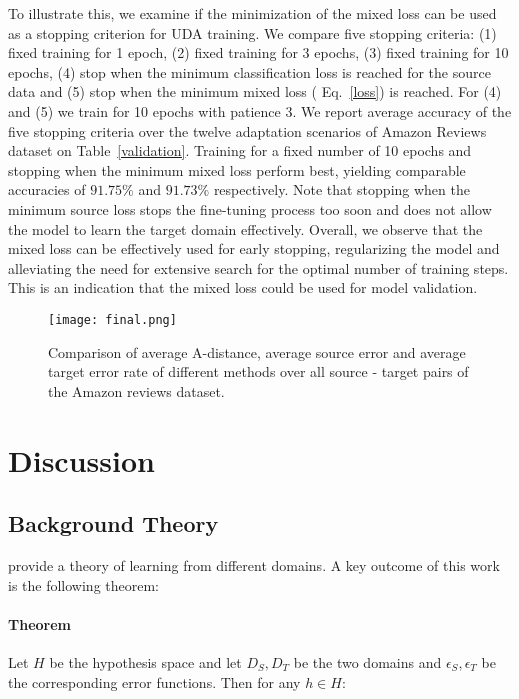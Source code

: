 \documentclass[11pt]{article}
\begin{document}
To illustrate this, we examine if the minimization of the mixed loss can be used as a stopping criterion for UDA training.
We compare five stopping criteria: (1) fixed training for 1 epoch, (2) fixed training for 3 epochs, (3) fixed training for 10 epochs, 
(4) stop when the minimum classification loss is reached for the source data and (5) stop when the minimum mixed loss ( Eq.~\ref{loss}) is reached. For (4) and (5) we train for 10 epochs with patience 3. 
We report average accuracy of the five stopping criteria over the twelve adaptation scenarios of Amazon Reviews dataset on Table~\ref{validation}. 
Training for a fixed number of 10 epochs and stopping when the minimum mixed loss perform best, yielding comparable accuracies of $91.75\%$ and $91.73\%$ respectively.
Note that stopping when the minimum source loss stops the fine-tuning process too soon and does not allow the model to learn the target domain effectively.
Overall, we observe that the mixed loss can be effectively used for early stopping, regularizing the model and alleviating the need for extensive search for the optimal number of training steps.
This is an indication that the mixed loss could be used for model validation.

\begin{figure*}[ht]
\centering
\texttt{[image: final.png]}
\caption{Comparison of average A-distance, average source error and average target error rate of different methods over all source - target pairs of the Amazon reviews dataset. }
\label{fig:adistance}
\end{figure*}

\section{Discussion}
\label{discussion}
\subsection{Background Theory}

\citet{ben2007analysis, ben2010theory} provide a theory of learning from different domains.
A key outcome of this work is the following theorem:

\paragraph{Theorem}\citep{ben2007analysis, ben2010theory}
\label{theorem:paragraph}
 Let \(H\) be the hypothesis space and let \(D_S, D_T\) be the two domains and \(\epsilon_S, \epsilon_T\) be the corresponding error functions. Then for any \(h \in H\):
\end{document}

